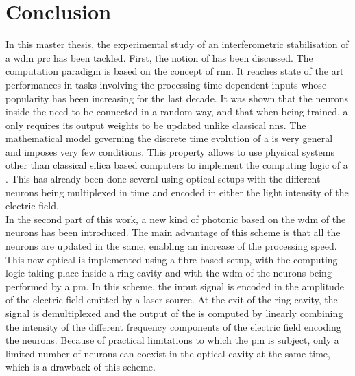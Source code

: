 \chapter{Conclusion}

In this master thesis, the experimental study of an interferometric stabilisation of a \gls{wdm} \gls{prc} has been tackled. First, the notion of \rc has been discussed. The \rc computation paradigm is based on the concept of \gls{rnn}. It reaches state of the art performances in tasks involving the processing time-dependent inputs whose popularity has been increasing for the last decade. It was shown that the neurons inside the \rcer need to be connected in a random way, and that when being trained, a \rcer only requires its output weights to be updated unlike classical \glspl{nn}. The mathematical model governing the discrete time evolution of a \rcer is very general and imposes very few conditions. This property allows to use physical systems other than classical silica based computers to implement the computing logic of a \rcer. This has already been done several using optical setups with the different neurons being multiplexed in time and encoded in either the light intensity of the electric field.\\

In the second part of this work, a new kind of photonic \rcer based on the \gls{wdm} of the neurons has been introduced. The main advantage of this scheme is that all the neurons are updated in the same, enabling an increase of the processing speed. This new optical \rcer is implemented using a fibre-based setup, with the \rc computing logic taking place inside a ring cavity and with the \gls{wdm} of the neurons being performed by a \gls{pm}. In this scheme, the input signal is encoded in the amplitude of the electric field emitted by a laser source. At the exit of the ring cavity, the signal is demultiplexed and the output of the \rcer is computed by linearly combining the intensity of the different frequency components of the electric field encoding the neurons. Because of practical limitations to which the \gls{pm} is subject, only a limited number of neurons can coexist in the optical cavity at the same time, which is a drawback of this scheme. \\

